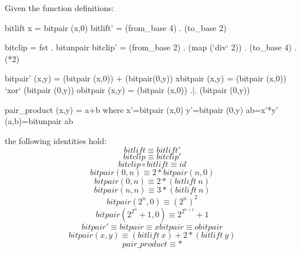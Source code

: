 \documentclass[]{INCLUDES/llncs}
\begin{document}
\begin{prop}
Given the function definitions:
\begin{code}
bitlift x = bitpair (x,0)
bitlift' = (from_base 4) . (to_base 2)

bitclip = fst . bitunpair
bitclip' = (from_base 2) . (map (`div` 2)) . (to_base 4) . (*2)

bitpair' (x,y) = (bitpair (x,0))   +   (bitpair(0,y))
xbitpair (x,y) = (bitpair (x,0)) `xor` (bitpair (0,y))
obitpair (x,y) = (bitpair (x,0))  .|.  (bitpair (0,y))

pair_product (x,y) = a+b where
  x'=bitpair (x,0)
  y'=bitpair (0,y)
  ab=x'*y'
  (a,b)=bitunpair ab
\end{code}
the following identities hold:
\begin{equation}
bitlift \equiv bitlift'
\end{equation}
\begin{equation}
bitclip \equiv bitclip'
\end{equation}
\begin{equation}
bitclip \circ bitlift \equiv id 
\end{equation}
\begin{equation}
bitpair (0,n) \equiv 2*bitpair(n,0)
\end{equation}
\begin{equation}
bitpair (0,n) \equiv 2*(bitlift~n)
\end{equation}
\begin{equation}
bitpair (n,n) \equiv 3*(bitlift~n)
\end{equation}
\begin{equation}  \label{bitpow}
bitpair (2^n,0) \equiv  ({2^n})^2
\end{equation}
\begin{equation}  \label{biteq}
bitpair (2^{2^n}+1,0) \equiv 2^{2^{n+1}}+1
\end{equation}
\begin{equation}
bitpair' \equiv bitpair \equiv xbitpair \equiv obitpair
\end{equation}
\begin{equation}
bitpair (x,y) \equiv (bitlift~x)+2*(bitlift~y) 
\end{equation}
\begin{equation}
pair\_product \equiv *
\end{equation}
\end{prop}
\end{document}
